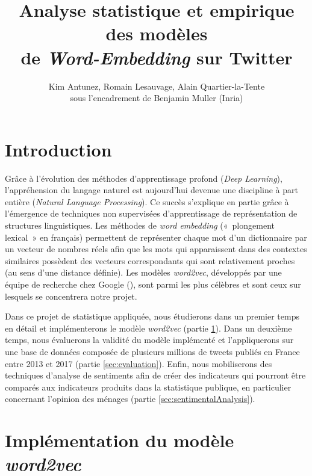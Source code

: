 \documentclass[11pt,french,french]{article}
\title{Analyse statistique et empirique des modèles\\
de \emph{Word-Embedding} sur Twitter}
\author{Kim Antunez, Romain Lesauvage, Alain Quartier-la-Tente\\
sous l'encadrement de Benjamin Muller (Inria)}
\date{}
\begin{document}
\maketitle


{
\hypersetup{linkcolor=black}
\setcounter{tocdepth}{2}
\tableofcontents
}
\newpage

\hypertarget{introduction}{%
\section*{Introduction}\label{introduction}}

Grâce à l'évolution des méthodes d'apprentissage profond (\emph{Deep Learning}), l'appréhension du langage naturel est aujourd'hui devenue une discipline à part entière (\emph{Natural Language Processing}).
Ce succès s'explique en partie grâce à l'émergence de techniques non supervisées d'apprentissage de représentation de structures linguistiques.
Les méthodes de \emph{word embedding} («~plongement lexical~» en français) permettent de représenter chaque mot d'un dictionnaire par un vecteur de nombres réels afin que les mots qui apparaissent dans des contextes similaires possèdent des vecteurs correspondants qui sont relativement proches (au sens d'une distance définie).
Les modèles \emph{word2vec}, développés par une équipe de recherche chez Google (\cite{Mikolov}), sont parmi les plus célèbres et sont ceux sur lesquels se concentrera notre projet.

Dans ce projet de statistique appliquée, nous étudierons dans un premier temps en détail et implémenterons le modèle \emph{word2vec} (partie \ref{sec:word2vec}).
Dans un deuxième temps, nous évaluerons la validité du modèle implémenté et l'appliquerons sur une base de données composée de plusieurs millions de tweets publiés en France entre 2013 et 2017 (partie \ref{sec:evaluation}).
Enfin, nous mobiliserons des techniques d'analyse de sentiments afin de créer des indicateurs qui pourront être comparés aux indicateurs produits dans la statistique publique, en particulier concernant l'opinion des ménages (partie \ref{sec:sentimentalAnalysis}).

\hypertarget{sec:word2vec}{%
\section{\texorpdfstring{Implémentation du modèle \emph{word2vec}}{Implémentation du modèle word2vec}}\label{sec:word2vec}}
\end{document}
